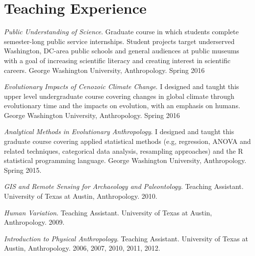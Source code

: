 \documentclass{article}
\begin{document}
\section*{Teaching Experience}
\begin{description*}

\item[] \emph{Public Understanding of Science}. Graduate course in which students complete semester-long public service internships. Student projects target underserved Washington, DC-area public schools and general audiences at public museums with a goal of increasing scientific literacy and creating interest in scientific careers. George Washington University, Anthropology. Spring 2016

\item[] \emph{Evolutionary Impacts of Cenozoic Climate Change}. I designed and taught this upper level undergraduate course covering changes in global climate through evolutionary time and the impacts on evolution, with an emphasis on humans.  George Washington University, Anthropology. Spring 2016

\item[] \emph{Analytical Methods in Evolutionary Anthropology}. I designed and taught this graduate course covering applied statistical methods (e.g, regression, ANOVA and related techniques, categorical data analysis, resampling approaches) and the R statistical programming language. George Washington University, Anthropology. Spring 2015.

\item[] \emph{GIS and Remote Sensing for Archaeology and Paleontology}. Teaching Assistant.  University of Texas at Austin, Anthropology. 2010.

\item[] \emph{Human Variation}. Teaching Assistant. University of Texas at Austin, Anthropology. 2009.

\item[] \emph{Introduction to Physical Anthropology}. Teaching Assistant. University of Texas at Austin, Anthropology. 2006, 2007, 2010, 2011, 2012.
\end{description*}
\end{document}
